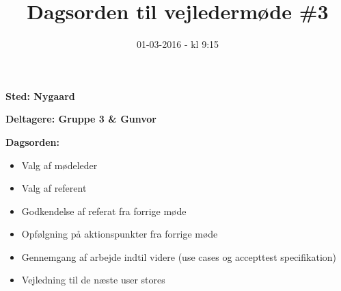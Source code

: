 \documentclass{article}
\title{Dagsorden til vejledermøde \#3}
\date{01-03-2016 - kl 9:15}
\begin{document}
	\maketitle

	\textbf{Sted: Nygaard}
	
	\textbf{Deltagere: Gruppe 3 \& Gunvor}
	
	\textbf{Dagsorden:}
	\begin{itemize}
		\item Valg af mødeleder
		\item Valg af referent
		\item Godkendelse af referat fra forrige møde 
		\item Opfølgning på aktionspunkter fra forrige møde
		\item Gennemgang af arbejde indtil videre (use cases og accepttest specifikation)
		\item Vejledning til de næste user stores
	\end{itemize}
\end{document}
